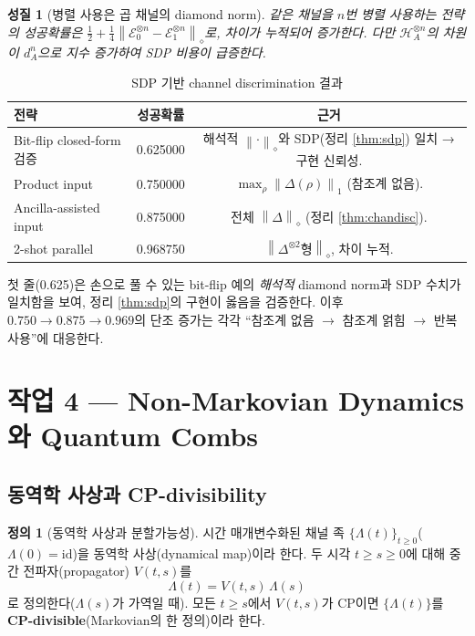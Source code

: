 \documentclass[11pt,a4paper]{article}
\newcommand{\E}{\mathcal{E}}
\newcommand{\Hcal}{\mathcal{H}}
\newcommand{\id}{\mathrm{id}}
\newcommand{\diamondnorm}[1]{\left\lVert #1 \right\rVert_{\diamond}}
\newcommand{\onenorm}[1]{\left\lVert #1 \right\rVert_{1}}
\theoremstyle{definition}
\newtheorem{definition}{정의}[section]
\theoremstyle{plain}
\newtheorem{property}{성질}[section]
\theoremstyle{remark}
\begin{document}
\begin{property}[병렬 사용은 곱 채널의 diamond norm]
같은 채널을 $n$번 병렬 사용하는 전략의 성공확률은 $\tfrac12+\tfrac14\diamondnorm{\E_0^{\otimes n}-\E_1^{\otimes n}}$로, 차이가 누적되어 증가한다. 다만 $\Hcal_A^{\otimes n}$의 차원이 $d_A^n$으로 지수 증가하여 SDP 비용이 급증한다.
\end{property}

\begin{table}[H]
\centering
\begin{tabular}{lcc}
\toprule
전략 & 성공확률 & 근거 \\
\midrule
Bit-flip closed-form 검증 & 0.625000 & 해석적 $\diamondnorm{\cdot}$와 SDP(정리 \ref{thm:sdp}) 일치 → 구현 신뢰성. \\
Product input & 0.750000 & $\max_\rho\onenorm{\Delta(\rho)}$ (참조계 없음). \\
Ancilla-assisted input & 0.875000 & 전체 $\diamondnorm{\Delta}$ (정리 \ref{thm:chandisc}). \\
2-shot parallel & 0.968750 & $\diamondnorm{\Delta^{\otimes2}\text{형}}$, 차이 누적. \\
\bottomrule
\end{tabular}
\caption{SDP 기반 channel discrimination 결과}
\label{tab:sdp-results}
\end{table}

첫 줄(0.625)은 손으로 풀 수 있는 bit-flip 예의 \emph{해석적} diamond norm과 SDP 수치가 일치함을 보여, 정리 \ref{thm:sdp}의 구현이 옳음을 검증한다. 이후 $0.750\to0.875\to0.969$의 단조 증가는 각각 ``참조계 없음 $\to$ 참조계 얽힘 $\to$ 반복 사용''에 대응한다.

\section{작업 4 --- Non-Markovian Dynamics와 Quantum Combs}

\subsection{동역학 사상과 CP-divisibility}

\begin{definition}[동역학 사상과 분할가능성]
시간 매개변수화된 채널 족 $\{\Lambda(t)\}_{t\ge0}$($\Lambda(0)=\id$)을 동역학 사상(dynamical map)이라 한다. 두 시각 $t\ge s\ge0$에 대해 중간 전파자(propagator) $V(t,s)$를
\[
\Lambda(t)=V(t,s)\,\Lambda(s)
\]
로 정의한다($\Lambda(s)$가 가역일 때). 모든 $t\ge s$에서 $V(t,s)$가 CP이면 $\{\Lambda(t)\}$를 \textbf{CP-divisible}(Markovian의 한 정의)이라 한다.
\end{definition}
\end{document}
